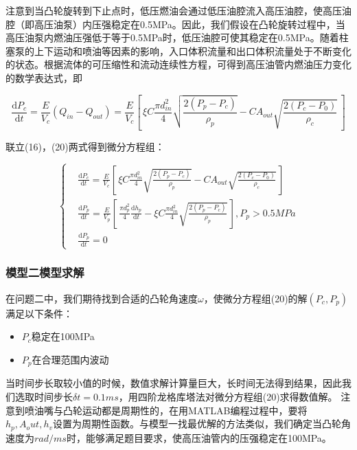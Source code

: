 \documentclass[withoutpreface,bwprint]{cumcmthesis} %
\begin{document}
			注意到当凸轮旋转到下止点时，低压燃油会通过低压油腔流入高压油腔，使高压油腔（即高压油泵）内压强稳定在0.5MPa。因此，我们假设在凸轮旋转过程中，当高压油泵内燃油压强低于等于0.5MPa时，低压油腔可使其稳定在0.5MPa。随着柱塞泵的上下运动和喷油等因素的影响，入口体积流量和出口体积流量处于不断变化的状态。根据流体的可压缩性和流动连续性方程，可得到高压油管内燃油压力变化的数学表达式，即
			
			\begin{equation}\frac{\mathrm{d}P_c}{\mathrm{d}t} = \frac{E}{V_c}(Q_{in} - Q_{out}) = \frac{E}{V_c} \left[ \, \xi C \frac{\pi d_{in}^2}{4} \sqrt{\frac{2(P_p - P_c)}{\rho_p}} - CA_{out} \sqrt{\frac{2(P_c - P_0)}{\rho_c}} \, \right]\end{equation}
			
			联立(16)，(20)两式得到微分方程组：
			
			\begin{equation} \left\{
			\begin{aligned}
			&\frac{\mathrm{d}P_c}{\mathrm{d}t} = \frac{E}{V_c} \left[ \, \xi C \frac{\pi d_{in}^2}{4} \sqrt{\frac{2(P_p - P_c)}{\rho_p}} - CA_{out} \sqrt{\frac{2(P_c - P_0)}{\rho_c}} \, \right] \\
			&\frac{\mathrm{d}P_p}{\mathrm{d}t} = \frac{E}{V_p} \left[ \, \frac{\pi d_p^2}{4}  \frac{\mathrm{d}h_p}{\mathrm{d}t} - \xi C \frac{\pi d_{in}^2}{4} \sqrt{\frac{2(P_p - P_c)}{\rho_p}} \, \right],P_p>0.5MPa \\
			&\frac{\mathrm{d}P_p}{\mathrm{d}t} = 0
			\end{aligned}\right. 
			\end{equation}
			
			\subsubsection{模型二模型求解}
			在问题二中，我们期待找到合适的凸轮角速度$\omega$，使微分方程组(20)的解$(P_c,P_p)$满足以下条件：
			\begin{itemize}
				\item $P_c$稳定在100MPa
				\item $P_p$在合理范围内波动
			\end{itemize}
		
			当时间步长取较小值的时候，数值求解计算量巨大，长时间无法得到结果，因此我们选取时间步长$\delta t = 0.1ms$，用四阶龙格库塔法对微分方程组(20)求得数值解。
			注意到喷油嘴与凸轮运动都是周期性的，在用MATLAB编程过程中，要将$h_p,A_out,h_v$设置为周期性函数。与模型一找最优解的方法类似，我们确定当凸轮角速度为$rad/ms$时，能够满足题目要求，使高压油管内的压强稳定在100MPa。
						
\end{document}
